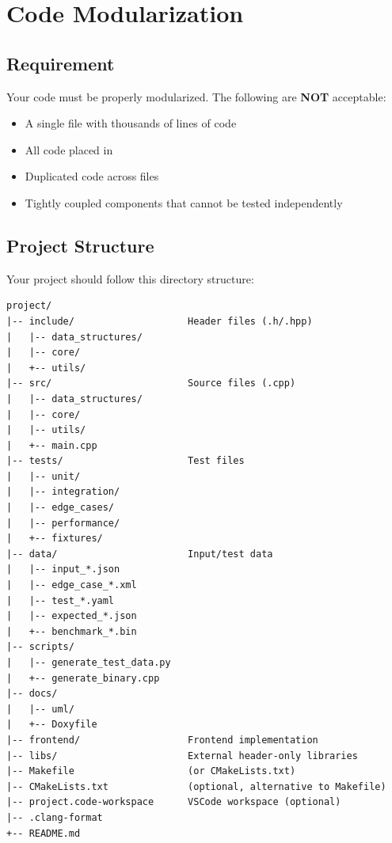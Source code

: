 
\section{Code Modularization}

\subsection{Requirement}

Your code must be properly modularized. The following are \textbf{NOT} acceptable:

\begin{itemize}
  \item A single file with thousands of lines of code
  \item All code placed in 
  \item Duplicated code across files
  \item Tightly coupled components that cannot be tested independently
\end{itemize}

\subsection{Project Structure}

Your project should follow this directory structure:

\begin{lstlisting}[style=tree]
project/
|-- include/                    Header files (.h/.hpp)
|   |-- data_structures/
|   |-- core/
|   +-- utils/
|-- src/                        Source files (.cpp)
|   |-- data_structures/
|   |-- core/
|   |-- utils/
|   +-- main.cpp
|-- tests/                      Test files
|   |-- unit/
|   |-- integration/
|   |-- edge_cases/
|   |-- performance/
|   +-- fixtures/
|-- data/                       Input/test data
|   |-- input_*.json
|   |-- edge_case_*.xml
|   |-- test_*.yaml
|   |-- expected_*.json
|   +-- benchmark_*.bin
|-- scripts/
|   |-- generate_test_data.py
|   +-- generate_binary.cpp
|-- docs/
|   |-- uml/
|   +-- Doxyfile
|-- frontend/                   Frontend implementation
|-- libs/                       External header-only libraries
|-- Makefile                    (or CMakeLists.txt)
|-- CMakeLists.txt              (optional, alternative to Makefile)
|-- project.code-workspace      VSCode workspace (optional)
|-- .clang-format
+-- README.md
\end{lstlisting}


